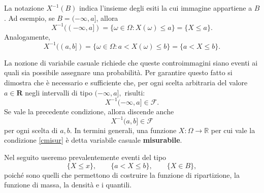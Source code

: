 La notazione $X^{-1}(B)$ indica l'insieme degli esiti la cui immagine
appartiene a $B$. Ad esempio, se $B=(-\infty,a]$, allora
\[
X^{-1}((-\infty,a]) = \{\omega\in\Omega:X(\omega)\leq a\} = \{X\leq a\}.
\]
Analogamente,
\[
X^{-1}((a,b]) = \{\omega\in\Omega:a<X(\omega)\leq b\} = \{a<X\leq b\}.
\]


La nozione di variabile casuale richiede che queste controimmagini siano
eventi ai quali sia possibile assegnare una probabilit\`{a}. Per garantire
questo fatto si dimostra che \`{e} necessario e sufficiente che, per ogni
scelta arbitraria del valore $a\in\mathbf{R}$ negli intervalli di tipo
$(-\infty,a],$ risulti:%
\begin{equation}
X^{-1}(-\infty,a]\in\mathcal{F}. \label{cmisur}%
\end{equation}
Se vale la precedente condizione, allora discende anche
\[
X^{-1}(a,b]\in\mathcal{F}%
\]
per ogni scelta di $a,b$. In termini generali, una funzione $X:\Omega
\rightarrow\mathbb{R}$ per cui vale la condizione \ref{cmisur} \`{e} detta
variabile casuale \textbf{misurabile}.

Nel seguito useremo prevalentemente eventi del tipo
\[
\{X\leq x\},\qquad\{a<X\leq b\},\qquad\{X\in B\},
\]
poich\'{e} sono quelli che permettono di costruire la funzione di
ripartizione, la funzione di massa, la densit\`{a} e i quantili.

